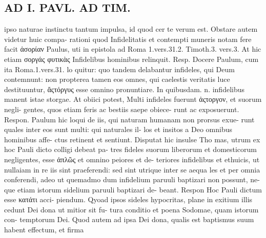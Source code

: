 \documentclass{article}
\begin{document}
\begin{pages}
\section*{AD I. PAVL. AD TIM. }
\marginpar{[ p.268 ]}ipso naturae instinctu tantum impulsa, id quod cer te verum est. Obstare autem videtur huic compa- rationi quod Infidelitatis et contempti muneris notam fere facit ἀσορίαν Paulus, uti in epistola ad Roma 1.vers.31.2. Timoth.3. vers.3. At hic etiam σοργάς φυτικὰς Infidelibus hominibus relinquit. Resp. Docere Paulum, cum ita Roma.1.vers.31. lo quitur: quo tandem delabantur infideles, qui Deum contemnunt: non propterea tamen eos omnes, qui caelestis veritatis luce destituuntur, ἄςτόργυς esse omnino pronuntiare. In quibusdam. n. infidelibus manent istae storgae. At obiici potest, Multi infideles fuerunt ἀςτοργον, et suorum negli- gentes, quos etiam feris ac bestiis saepe obiece- runt ac exposuerunt. Respon. Paulum hic loqui de iis, qui naturam humanam non prorsus exue- runt quales inter eos sunt multi: qui naturales il- los et insitos a Deo omnibus hominibus affe- ctus retinent et sentiunt. Disputat hic insulse Tho mas, utrum ex hoc Pauli dicto colligi debeat pa- tres fideles suorum liberorum et domesticorum negligentes, esse ἀπλῶς et omnino peiores et de- teriores infidelibus et ethuicis, ut nullaiam in re iis sint praeferendi: sed sint utrique inter se aequa les et per omnia conferendi, adeo ut quemadmo dum infidelium paruuli baptizari non possunt, ne- que etiam istorum sidelium paruuli baptizari de- beant. Respon Hoc Pauli dictum esse κατάτι acci- piendum. Qyoad ipsos sideles hypocritas, plane in exitium illis cedunt Dei dona ut mitior sit fu- tura conditio et poena Sodomae, quam istorum con- temptorum Dei. Quod autem ad ipsa Dei dona, qualis est baptismus suum habent effectum, et firma 

\end{pages}
\end{document}
